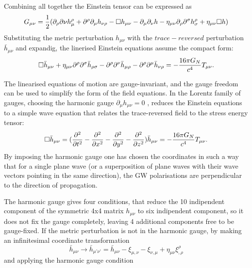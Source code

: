 \documentclass[binding=0.6cm, LaM]{sapthesis}
\begin{document}
Combining all together the Einstein tensor can be expressed as
\begin{equation}
G_{\mu\nu} = {1 \over 2}(\partial_{\rho}\partial{\nu}h^{\rho}_{\mu} + \partial^{\rho}\partial_{\mu}h_{\nu\rho} - \square h_{\mu\nu} - \partial_{\mu}\partial_{\nu}h - \eta_{\mu\nu}\partial_{\rho}\partial^{\sigma}h^{\rho}_{\sigma} + \eta_{\mu\nu}\square h)
\end{equation}
Substituting the metric perturbation $h_{\mu\nu}$  with the $trace-reversed$ perturbation ${\bar h}_{\mu\nu}$ and expandig, the linerised Einstein equations assume the  compact form:
\begin{equation}
\square {\bar h}_{\mu\nu} + \eta_{\mu\nu}{\partial}^{\rho}{\partial}^{\sigma}{\bar h}_{\rho\sigma} - {\partial}^{\rho}{\partial}^{\nu}{\bar h}_{\mu\rho} - {\partial}^{\rho}{\partial}^{\mu}{\bar h}_{\nu\rho} = - {{16\pi G_{N}} \over {c^4}}T_{\mu\nu}.
\end{equation}


The linearised equations of motion are gauge-invariant, and the gauge freedom can
 be used to simplify the form of the field equations.
 In the Lorentz family of gauges, choosing the harmonic gauge 
 $ \partial_{\mu}h_{\mu\nu} = 0 $ 
 , reduces the Einstein equations to a simple wave equation that relates the trace-reversed field
 to the stress energy tensor:
\begin{equation}
\square {\bar h}_{\mu\nu} =({\partial^2 \over {\partial t^2} } - {\partial^2 \over {\partial x^2}}  - {\partial^2 \over {\partial y^2}}  -  {\partial^2 \over {\partial z^2}}) {\bar h}_{\mu\nu} = -{{16\pi G_{N}} \over {c^4}}T_{\mu\nu}. 
\end{equation}
By imposing the harmonic gauge one has chosen the coordinates in such a way that for a single plane wave (or a superposition of plane waves with their wave vectors pointing in the same direction), 
the GW polarisations are perpendicular to the direction of propagation.

The harmonic gauge gives four conditions, that reduce the 10 indipendent component of the symmetric 4x4 matrix $h_{\mu\nu}$ to six indipendent component, so it does not fix the gauge completely, 
leaving 4 additional components free to be gauge-fixed.  
If the metric perturbation is not in the harmonic gauge, by making an infinitesimal coordinate transformation 
\begin{equation}
{\bar h}_{\mu\nu} \rightarrow {\bar h}_{\mu’\nu’}  = {\bar h}_{\mu\nu}  - \xi_{\mu,\nu} -\xi_{\nu,\mu} + \eta_{\mu\nu}\xi^{\rho}_{,\rho}
\end{equation}
and applying the harmonic gauge condition
\end{document}
